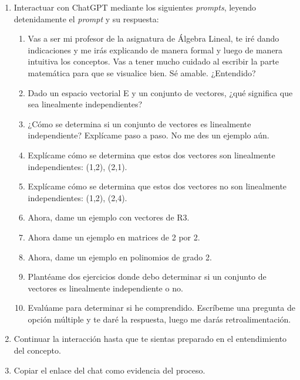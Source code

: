 \documentclass[a4,11pt]{aleph-notas}
\begin{document}
\begin{enumerate}[leftmargin=*]
    \item Interactuar con ChatGPT mediante los siguientes \textit{prompts}, leyendo detenidamente el \textit{prompt} y su respuesta:
    \begin{enumerate}[label=\textit{Prompt \arabic*.},leftmargin=2.1cm]
        \item Vas a ser mi profesor de la asignatura de Álgebra Lineal, te iré dando indicaciones y me irás explicando de manera formal y luego de manera intuitiva los conceptos. Vas a tener mucho cuidado al escribir la parte matemática para que se visualice bien. Sé amable. ¿Entendido?
        \item Dado un espacio vectorial E y un conjunto de vectores, ¿qué significa que sea linealmente independientes?
        \item ¿Cómo se determina si un conjunto de vectores es linealmente independiente? Explícame paso a paso. No me des un ejemplo aún.
        \item Explícame cómo se determina que estos dos vectores son linealmente independientes: (1,2), (2,1). 
        \item Explícame cómo se determina que estos dos vectores no son linealmente independientes: (1,2), (2,4). 
        \item Ahora, dame un ejemplo con vectores de R3.
        \item Ahora dame un ejemplo en matrices de 2 por 2.
        \item Ahora, dame un ejemplo en polinomios de grado 2.
        \item Plantéame dos ejercicios donde debo determinar si un conjunto de vectores es linealmente independiente o no.
        \item Evalúame para determinar si he comprendido. Escríbeme una pregunta de opción múltiple y te daré la respuesta, luego me darás retroalimentación.
    \end{enumerate}
    \item Continuar la interacción hasta que te sientas preparado en el entendimiento del concepto.
    \item Copiar el enlace del chat como evidencia del proceso.
\end{enumerate}
\end{document}
